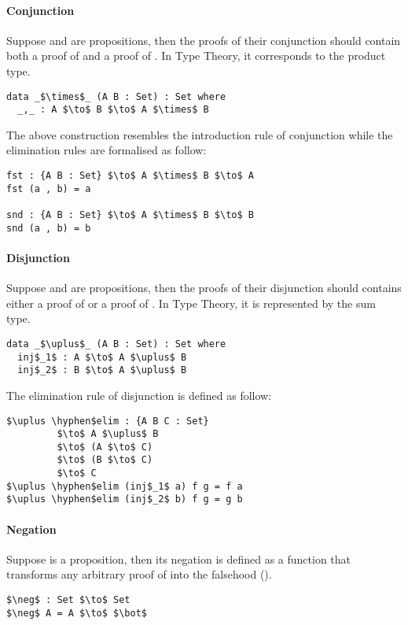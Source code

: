 \paragraph{Conjunction} Suppose  and  are propositions, then the
proofs of their conjunction  should contain both a proof of  and a proof
of . In Type Theory, it corresponds
to the product type. 
\begin{lstlisting}[mathescape=true,xleftmargin=.3\textwidth]
data _$\times$_ (A B : Set) : Set where
  _,_ : A $\to$ B $\to$ A $\times$ B
\end{lstlisting} 

\par The above construction resembles the introduction rule of
conjunction while the elimination rules are formalised as follow:
\begin{lstlisting}[mathescape=true,xleftmargin=.3\textwidth]
fst : {A B : Set} $\to$ A $\times$ B $\to$ A
fst (a , b) = a

snd : {A B : Set} $\to$ A $\times$ B $\to$ B
snd (a , b) = b
\end{lstlisting} 


\paragraph{Disjunction} Suppose  and  are propositions, then the
proofs of their disjunction  should contains either a proof of  or a
proof of . In Type Theory, it is represented by the sum type. 
\begin{lstlisting}[mathescape=true,xleftmargin=.3\textwidth]
data _$\uplus$_ (A B : Set) : Set where
  inj$_1$ : A $\to$ A $\uplus$ B
  inj$_2$ : B $\to$ A $\uplus$ B
\end{lstlisting} 

\par The elimination rule of disjunction is defined as follow: 
\begin{lstlisting}[mathescape=true,xleftmargin=.3\textwidth]
$\uplus \hyphen$elim : {A B C : Set} 
         $\to$ A $\uplus$ B 
         $\to$ (A $\to$ C) 
         $\to$ (B $\to$ C) 
         $\to$ C
$\uplus \hyphen$elim (inj$_1$ a) f g = f a
$\uplus \hyphen$elim (inj$_2$ b) f g = g b
\end{lstlisting} 

\paragraph{Negation} Suppose  is a proposition, then its negation is
defined as a function that transforms any arbitrary proof of  into
the falsehood (\mb{\bot}). 
\begin{lstlisting}[mathescape=true,xleftmargin=.3\textwidth]
$\neg$ : Set $\to$ Set
$\neg$ A = A $\to$ $\bot$
\end{lstlisting} 


